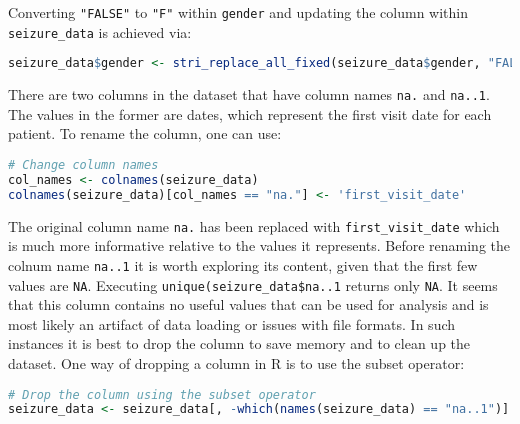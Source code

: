 Converting \verb|"FALSE"| to \verb|"F"| within \verb|gender| and updating the column within \verb|seizure_data| is achieved via:
\begin{lstlisting}[language=R]
seizure_data$gender <- stri_replace_all_fixed(seizure_data$gender, "FALSE", "F")
\end{lstlisting}

There are two columns in the dataset that have column names \verb|na.| and \verb|na..1|. The values in the former are dates, which represent the first visit date for each patient. To rename the column, one can use:
\begin{lstlisting}[language=R]
# Change column names
col_names <- colnames(seizure_data)
colnames(seizure_data)[col_names == "na."] <- 'first_visit_date'
\end{lstlisting}
The original column name \verb|na.| has been replaced with \verb|first_visit_date| which is much more informative relative to the values it represents.
Before renaming the colnum name \verb|na..1| it is worth exploring its content, given that the first few values are \verb|NA|. Executing \verb|unique(seizure_data$na..1| returns only \verb|NA|. It seems that this column contains no useful values that can be used for analysis and is most likely an artifact of data loading or issues with file formats. In such instances it is best to drop the column to save memory and to clean up the dataset. One way of dropping a column in R is to use the subset operator:
\begin{lstlisting}[language=R]
# Drop the column using the subset operator
seizure_data <- seizure_data[, -which(names(seizure_data) == "na..1")]
\end{lstlisting}

